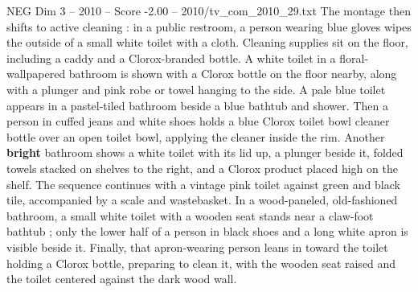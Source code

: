 \begin{textsample}{NEG Dim 3 – 2010 – Score -2.00 – 2010/tv\_com\_2010\_29.txt}
The montage then shifts to active cleaning : in a public restroom, a person wearing blue gloves wipes the outside of a small white toilet with a cloth.
Cleaning supplies sit on the floor, including a caddy and a Clorox-branded bottle.
A white toilet in a floral-wallpapered bathroom is shown with a Clorox bottle on the floor nearby, along with a plunger and pink robe or towel hanging to the side.
A pale blue toilet appears in a pastel-tiled bathroom beside a blue bathtub and shower.
Then a person in cuffed jeans and white shoes holds a blue Clorox toilet bowl cleaner bottle over an open toilet bowl, applying the cleaner inside the rim.
Another \textbf{bright} bathroom shows a white toilet with its lid up, a plunger beside it, folded towels stacked on shelves to the right, and a Clorox product placed high on the shelf.
The sequence continues with a vintage pink toilet against green and black tile, accompanied by a scale and wastebasket.
In a wood-paneled, old-fashioned bathroom, a small white toilet with a wooden seat stands near a claw-foot bathtub ; only the lower half of a person in black shoes and a long white apron is visible beside it.
Finally, that apron-wearing person leans in toward the toilet holding a Clorox bottle, preparing to clean it, with the wooden seat raised and the toilet centered against the dark wood wall.

\end{textsample}
